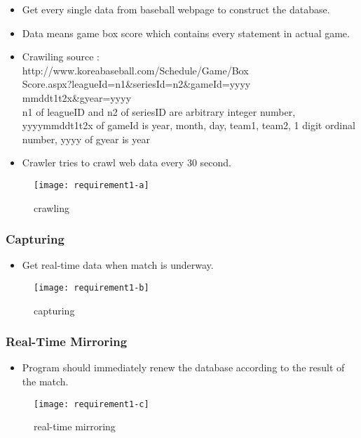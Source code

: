 \documentclass[conference,compsoc, twocolumn]{IEEEtran}
\begin{document}
\begin{itemize}
\item Get every single data from baseball webpage to construct the database.
\item Data means game box score which contains every statement in actual game.
\item Crawiling source : \\
	http://www.koreabaseball.com/Schedule/Game/Box\\Score.aspx?leagueId=n1\&seriesId=n2\&gameId=yyyy\\mmddt1t2x\&gyear=yyyy\\
	n1 of leagueID and n2 of seriesID are arbitrary integer number, yyyymmddt1t2x of gameId is year, month, day, team1, team2, 1 digit ordinal number, yyyy of gyear is year
\item Crawler tries to crawl web data every 30 second.
\end{itemize}

\begin{figure}[H]
\centering\texttt{[image: requirement1-a]}
\caption{crawling}
\end{figure}


\subsubsection{Capturing}

\begin{itemize}
\item Get real-time data when match is underway.
\end{itemize}

\begin{figure}[H]
\centering\texttt{[image: requirement1-b]}
\caption{capturing}
\end{figure}

\subsubsection{Real-Time Mirroring}

\begin{itemize}
\item Program should immediately renew the database according to the result of the match.
\end{itemize}

\begin{figure}[H]
\centering\texttt{[image: requirement1-c]}
\caption{real-time mirroring}
\end{figure}
\end{document}
